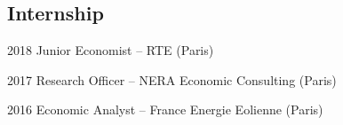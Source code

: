 \documentclass[letterpaper]{article}
\renewenvironment{itemize}{
  \begin{list}{}{
    \setlength{\leftmargin}{1.5em}
  }
}{
  \end{list}
}
\begin{document}
\subsection*{Internship
}
\begin{itemize}
    \item 2018 Junior Economist – RTE (Paris)
    \item 2017 Research Officer – NERA Economic Consulting (Paris)
    \item 2016 Economic Analyst – France Energie Eolienne (Paris)
 \end{itemize}

\bigskip
\end{document}
